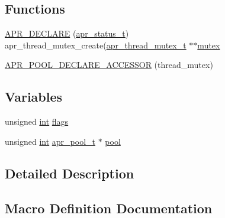 \subsection*{Functions}
\begin{DoxyCompactItemize}
\item 
\hyperlink{group__apr__thread__mutex_ga41aa0a42f2221afa01304558886da7f7}{A\+P\+R\+\_\+\+D\+E\+C\+L\+A\+RE} (\hyperlink{group__apr__errno_gaa5105fa83cc322f09382292db8b47593}{apr\+\_\+status\+\_\+t}) apr\+\_\+thread\+\_\+mutex\+\_\+create(\hyperlink{structapr__thread__mutex__t}{apr\+\_\+thread\+\_\+mutex\+\_\+t} $\ast$$\ast$\hyperlink{group__apr__thread__cond_ga9b5d997217b2ae4c884c535811cb6e35}{mutex}
\item 
\hyperlink{group__apr__thread__mutex_gafc67e0524ebc53ae30e81b53bd719d39}{A\+P\+R\+\_\+\+P\+O\+O\+L\+\_\+\+D\+E\+C\+L\+A\+R\+E\+\_\+\+A\+C\+C\+E\+S\+S\+OR} (thread\+\_\+mutex)
\end{DoxyCompactItemize}
\subsection*{Variables}
\begin{DoxyCompactItemize}
\item 
unsigned \hyperlink{pcre_8txt_a42dfa4ff673c82d8efe7144098fbc198}{int} \hyperlink{group__apr__thread__mutex_gac92588540e8c1d014a08cd8a45462b19}{flags}
\item 
unsigned \hyperlink{pcre_8txt_a42dfa4ff673c82d8efe7144098fbc198}{int} \hyperlink{structapr__pool__t}{apr\+\_\+pool\+\_\+t} $\ast$ \hyperlink{group__apr__thread__mutex_gaeca91775667c01adcd0521c0be80ed3b}{pool}
\end{DoxyCompactItemize}


\subsection{Detailed Description}


\subsection{Macro Definition Documentation}

